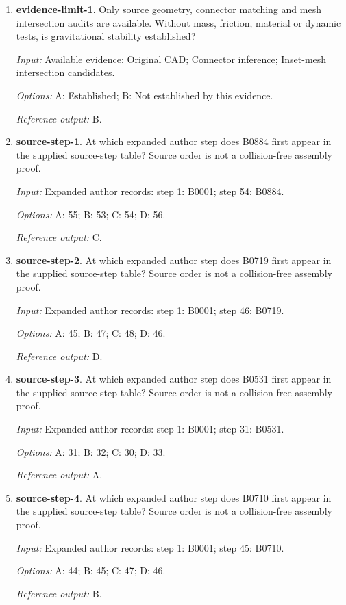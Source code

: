\begin{enumerate}
\item \textbf{evidence-limit-1}. Only source geometry, connector matching and mesh intersection audits are available. Without mass, friction, material or dynamic tests, is gravitational stability established?\par {\small \textit{Input:} Available evidence: Original CAD; Connector inference; Inset-mesh intersection candidates. \par\textit{Options:} A: Established; B: Not established by this evidence. \par\textit{Reference output:} B.}
\item \textbf{source-step-1}. At which expanded author step does B0884 first appear in the supplied source-step table? Source order is not a collision-free assembly proof.\par {\small \textit{Input:} Expanded author records: step 1: B0001; step 54: B0884. \par\textit{Options:} A: 55; B: 53; C: 54; D: 56. \par\textit{Reference output:} C.}
\item \textbf{source-step-2}. At which expanded author step does B0719 first appear in the supplied source-step table? Source order is not a collision-free assembly proof.\par {\small \textit{Input:} Expanded author records: step 1: B0001; step 46: B0719. \par\textit{Options:} A: 45; B: 47; C: 48; D: 46. \par\textit{Reference output:} D.}
\item \textbf{source-step-3}. At which expanded author step does B0531 first appear in the supplied source-step table? Source order is not a collision-free assembly proof.\par {\small \textit{Input:} Expanded author records: step 1: B0001; step 31: B0531. \par\textit{Options:} A: 31; B: 32; C: 30; D: 33. \par\textit{Reference output:} A.}
\item \textbf{source-step-4}. At which expanded author step does B0710 first appear in the supplied source-step table? Source order is not a collision-free assembly proof.\par {\small \textit{Input:} Expanded author records: step 1: B0001; step 45: B0710. \par\textit{Options:} A: 44; B: 45; C: 47; D: 46. \par\textit{Reference output:} B.}

\end{enumerate}
